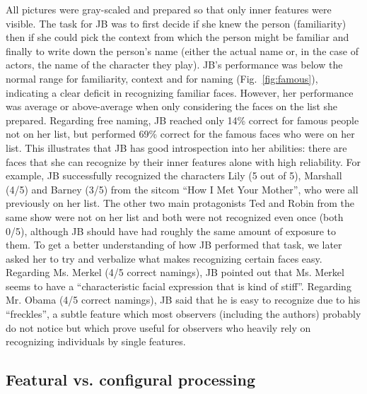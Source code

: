 \documentclass[fleqn,10pt]{SelfArx} %
\begin{document}
All pictures were gray-scaled and prepared so that only inner features were visible. The task for JB was to first decide if she knew the person (familiarity) then if she could pick the context from which the person might be familiar and finally to write down the person's name (either the actual name or, in the case of actors, the name of the character they play).
JB's performance was below the normal range for familiarity, context and for naming (Fig.~\ref{fig:famous}), indicating a clear deficit in recognizing familiar faces. However, her performance was average or above-average when only considering the faces on the list she prepared. Regarding free naming, JB reached only 14\% correct for famous people not on her list, but performed 69\% correct for the famous faces who were on her list. This illustrates that JB has good introspection into her abilities: there are faces that she can recognize by their inner features alone with high reliability. For example, JB successfully recognized the characters Lily (5 out of 5), Marshall (4/5) and Barney (3/5) from the sitcom “How I Met Your Mother”, who were all previously on her list. The other two main protagonists Ted and Robin from the same show were not on her list and both were not recognized even once (both 0/5), although JB should have had roughly the same amount of exposure to them.
To get a better understanding of how JB performed that task, we later asked her to try and verbalize what makes recognizing certain faces easy. Regarding Ms. Merkel (4/5 correct namings), JB pointed out that Ms. Merkel seems to have a “characteristic facial expression that is kind of stiff”. Regarding Mr. Obama (4/5 correct namings), JB said that he is easy to recognize due to his “freckles”, a subtle feature which most observers (including the authors) probably do not notice but which prove useful for observers who heavily rely on recognizing individuals by single features.


\subsection*{Featural vs. configural processing}
\end{document}
